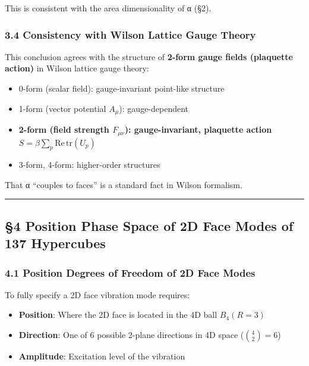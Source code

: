 \documentclass[
  11pt]{article}
\providecommand{\tightlist}{%
  \setlength{\itemsep}{0pt}\setlength{\parskip}{0pt}}
\begin{document}
This is consistent with the area dimensionality of α (§2).

\subsubsection{3.4 Consistency with Wilson Lattice Gauge
Theory}\label{consistency-with-wilson-lattice-gauge-theory}

This conclusion agrees with the structure of \textbf{2-form gauge fields
(plaquette action)} in Wilson lattice gauge theory:

\begin{itemize}
\tightlist
\item
  0-form (scalar field): gauge-invariant point-like structure
\item
  1-form (vector potential \(A_\mu\)): gauge-dependent
\item
  \textbf{2-form (field strength \(F_{\mu\nu}\)): gauge-invariant,
  plaquette action \(S = \beta \sum_p \text{Re}\,\text{tr}(U_p)\)}
\item
  3-form, 4-form: higher-order structures
\end{itemize}

That α ``couples to faces'' is a standard fact in Wilson formalism.

\begin{center}\rule{0.5\linewidth}{0.5pt}\end{center}

\subsection{§4 Position Phase Space of 2D Face Modes of 137
Hypercubes}\label{position-phase-space-of-2d-face-modes-of-137-hypercubes}

\subsubsection{4.1 Position Degrees of Freedom of 2D Face
Modes}\label{position-degrees-of-freedom-of-2d-face-modes}

To fully specify a 2D face vibration mode requires:

\begin{itemize}
\tightlist
\item
  \textbf{Position}: Where the 2D face is located in the 4D ball
  \(B_4(R=3)\)
\item
  \textbf{Direction}: One of 6 possible 2-plane directions in 4D space
  (\(\binom{4}{2} = 6\))
\item
  \textbf{Amplitude}: Excitation level of the vibration
\end{itemize}
\end{document}
